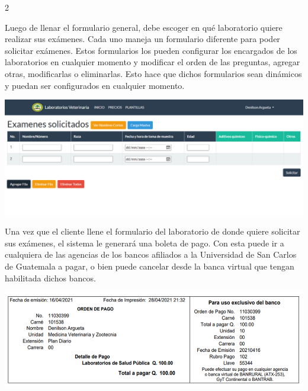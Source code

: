 \documentclass[12pt,spanish,Letterpaper,openany]{book}
\begin{document}
\begin {multicols}{2}
\begin {flushleft}
\begin{minipage}[c]{\columnwidth}
\end{minipage}
\end {flushleft}

Luego de llenar el formulario general, debe escoger en qué laboratorio quiere realizar sus exámenes. Cada uno maneja un formulario diferente para poder solicitar exámenes. Estos formularios los pueden configurar los encargados de los laboratorios en cualquier momento y modificar el orden de las preguntas, agregar otras, modificarlas o eliminarlas. Esto hace que dichos formularios sean dinámicos y puedan ser configurados en cualquier momento.

\begin {flushleft}
\noindent\begin{minipage}[c]{\columnwidth}

\includegraphics[width=1\linewidth]{images/denilson_02}

\end{minipage}
\end {flushleft}

Una vez que el cliente llene el formulario del laboratorio de donde quiere solicitar sus exámenes, el sistema le generará una boleta de pago. Con esta puede ir a cualquiera de las agencias de los bancos afiliados a la Universidad de San Carlos de Guatemala a pagar, o bien puede cancelar desde la banca virtual que tengan habilitada dichos bancos.

\begin {flushleft}
\noindent\begin{minipage}[c]{\columnwidth}

\includegraphics[width=1\linewidth]{images/denilson_03}


\end{minipage}
\end{flushleft}
\end{multicols}
\end{document}
